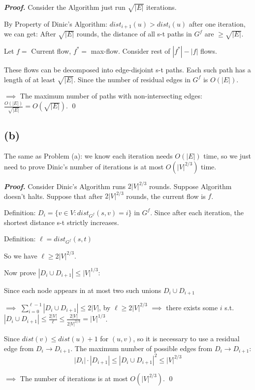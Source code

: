 \documentclass[11pt]{article}
\begin{document}
\textbf{\textit{Proof.}} Consider the Algorithm just run $\sqrt{|E|}$ iterations. 

By Property of Dinic's Algorithm: $dist_{i+1}(u) > dist_i (u)$ after one iteration, we can get: 
After $\sqrt{|E|}$ rounds, the distance of all s-t paths in $G^f$ are $\ge \sqrt{|E|}$. 

Let $f = $ Current flow, $f^* = $ max-flow. Consider rest of $|f^*|-|f|$ flows. 

These flows can be decomposed into edge-disjoint s-t paths. Each such path has a length of at least
$\sqrt{|E|}$. Since the number of residual edges in $G^f$ is $O(|E|)$. 

$\implies$ The maximum number of paths with non-intersecting edges: $\frac{O(|E|)}{\sqrt{|E|}}=O(\sqrt{|E|})$. \qed

\subsection*{(b)}
The same as Problem (a): we know each iteration needs $O(|E|)$ time, so we just need to prove 
Dinic's number of iterations is at most $O(|V|^{2/3})$ time. 

\textbf{\textit{Proof.}} Consider Dinic's Algorithm runs $2|V|^{2/3}$ rounds. Suppose Algorithm doesn't halts. 
Suppose that after $2|V|^{2/3}$ rounds, the current flow is $f$. 

Definition: $D_i = \{v \in V: dist_{G^f}(s, v) = i\}$ in $G^f$. Since after each iteration, the shortest distance s-t strictly increases. 

Definition: $\ell = dist_{G^f}(s, t)$

So we have $\ell \ge 2|V|^{2/3}$. 

Now prove $|D_i \cup D_{i+1}| \le |V|^{1/3}$: 

Since each node appears in at most two such unions $D_i \cup D_{i+1} $

$\implies$ $\sum_{i=0}^{\ell - 1}|D_i \cup D_{i+1}| \le 2|V|$, by $\ell \ge 2|V|^{2/3}$ $\implies$ there exists some $i$ s.t. $|D_i \cup D_{i+1}| \le \frac{2|V|}{\ell} \le \frac{2|V|}{2|V|^{2/3}} = |V|^{1/3}$. 

Since $dist(v) \le dist(u) + 1$ for $(u,v)$, so it is necessary to use a residual edge from $D_i \to D_{i+1}$. 
The maximum number of possible edges from $D_i \to D_{i+1}$: 
\[|D_i| \cdot |D_{i+1}| \le |D_i \cup D_{i+1}|^2 \le |V|^{2/3}\]

$\implies$ The number of iterations is at most $O(|V|^{2/3})$. \qed
\end{document}
